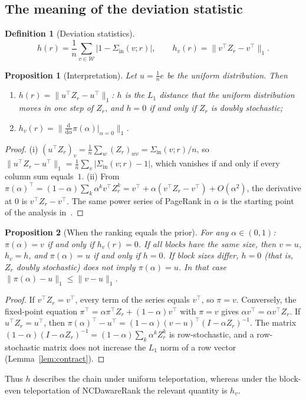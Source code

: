 \documentclass[11pt,a4paper]{article}
\newtheorem{proposition}{Proposition}
\theoremstyle{definition}
\newtheorem{definition}{Definition}
\theoremstyle{remark}
\newcommand{\Sin}{\Sigma_{\mathrm{in}}}
\begin{document}
\subsection{The meaning of the deviation statistic}
\begin{definition}[Deviation statistics]
\[
h(r)=\frac1n\sum_{v\in\mathcal W}\bigl|1-\Sin(v;r)\bigr|,\qquad
h_v(r)=\bigl\|v^\top Z_r-v^\top\bigr\|_1 .
\]
\end{definition}

\begin{proposition}[Interpretation]\label{prop:interp}
Let $u=\frac1n e$ be the uniform distribution. Then
\begin{enumerate}[label=(\roman*),leftmargin=2em,itemsep=0pt]
\item $h(r)=\|u^\top Z_r-u^\top\|_1$: $h$ is the $L_1$ distance that the uniform distribution moves in
one step of $Z_r$, and $h=0$ if and only if $Z_r$ is doubly stochastic;
\item $h_v(r)=\bigl\|\tfrac{\mathrm d}{\mathrm d\alpha}\pi(\alpha)\big|_{\alpha=0}\bigr\|_1$.
\end{enumerate}
\end{proposition}
\begin{proof}
(i) $(u^\top Z_r)_v=\frac1n\sum_w(Z_r)_{wv}=\Sin(v;r)/n$, so $\|u^\top Z_r-u^\top\|_1=\frac1n\sum_v|\Sin(v;r)-1|$,
which vanishes if and only if every column sum equals~$1$.
(ii) From $\pi(\alpha)^\top=(1-\alpha)\sum_k\alpha^kv^\top Z_r^k=v^\top+\alpha(v^\top Z_r-v^\top)+O(\alpha^2)$,
the derivative at $0$ is $v^\top Z_r-v^\top$. The same power series of PageRank in $\alpha$ is the starting
point of the analysis in~\cite{boldi09}.
\end{proof}

\begin{proposition}[When the ranking equals the prior]\label{prop:fixed}
For any $\alpha\in(0,1)$: $\pi(\alpha)=v$ if and only if $h_v(r)=0$. If all blocks have the same size,
then $v=u$, $h_v=h$, and $\pi(\alpha)=u$ if and only if $h=0$. If block sizes differ, $h=0$ (that is,
$Z_r$ doubly stochastic) does \emph{not} imply $\pi(\alpha)=u$. In that case
$\|\pi(\alpha)-u\|_1\le\|v-u\|_1$.
\end{proposition}
\begin{proof}
If $v^\top Z_r=v^\top$, every term of the series equals $v^\top$, so $\pi=v$. Conversely, the fixed-point
equation $\pi^\top=\alpha\pi^\top Z_r+(1-\alpha)v^\top$ with $\pi=v$ gives $\alpha v^\top=\alpha v^\top Z_r$.
If $u^\top Z_r=u^\top$, then $\pi(\alpha)^\top-u^\top=(1-\alpha)(v-u)^\top(I-\alpha Z_r)^{-1}$. The
matrix $(1-\alpha)(I-\alpha Z_r)^{-1}=(1-\alpha)\sum_k\alpha^kZ_r^k$ is row-stochastic, and a
row-stochastic matrix does not increase the $L_1$ norm of a row vector (Lemma~\ref{lem:contract}).
\end{proof}
\noindent
Thus $h$ describes the chain under uniform teleportation, whereas under the block-even teleportation of
NCDawareRank the relevant quantity is $h_v$.
\end{document}
